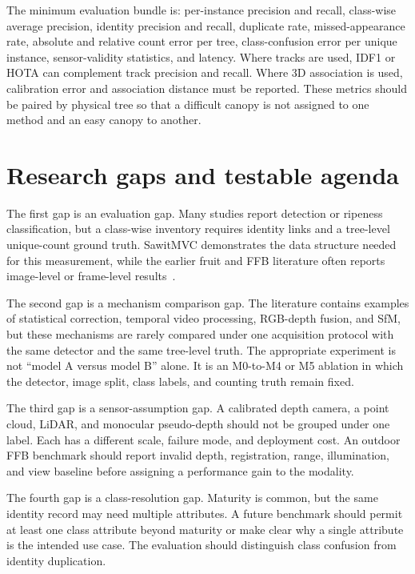 The minimum evaluation bundle is: per-instance precision and recall, class-wise average precision, identity precision and recall, duplicate rate, missed-appearance rate, absolute and relative count error per tree, class-confusion error per unique instance, sensor-validity statistics, and latency. Where tracks are used, IDF1 or HOTA can complement track precision and recall. Where 3D association is used, calibration error and association distance must be reported. These metrics should be paired by physical tree so that a difficult canopy is not assigned to one method and an easy canopy to another.


\section{Research gaps and testable agenda}
\label{sec:agenda}

The first gap is an evaluation gap. Many studies report detection or ripeness classification, but a class-wise inventory requires identity links and a tree-level unique-count ground truth. SawitMVC demonstrates the data structure needed for this measurement, while the earlier fruit and FFB literature often reports image-level or frame-level results~\cite{indriani2026sawitmvc,naftali2024palmcounter,koirala2019deepfruit}.

The second gap is a mechanism comparison gap. The literature contains examples of statistical correction, temporal video processing, RGB-depth fusion, and SfM, but these mechanisms are rarely compared under one acquisition protocol with the same detector and the same tree-level truth. The appropriate experiment is not ``model A versus model B'' alone. It is an M0-to-M4 or M5 ablation in which the detector, image split, class labels, and counting truth remain fixed.

The third gap is a sensor-assumption gap. A calibrated depth camera, a point cloud, LiDAR, and monocular pseudo-depth should not be grouped under one label. Each has a different scale, failure mode, and deployment cost. An outdoor FFB benchmark should report invalid depth, registration, range, illumination, and view baseline before assigning a performance gain to the modality.

The fourth gap is a class-resolution gap. Maturity is common, but the same identity record may need multiple attributes. A future benchmark should permit at least one class attribute beyond maturity or make clear why a single attribute is the intended use case. The evaluation should distinguish class confusion from identity duplication.

